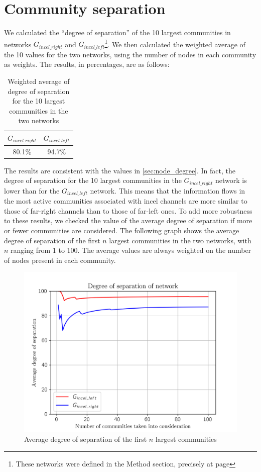 \documentclass[a4paper,twoside,12pt, openany]{book}
\begin{document}
\section{Community separation}
\label{ch:com_results}
We calculated the \enquote{degree of separation} of the 10 largest communities in networks $G_{incel\_right}$ and $G_{incel\_left}$\footnote{These networks were defined in the Method section, precisely at page \pageref{eq:couple_networks}}. We then calculated the weighted average of the 10 values for the two networks, using the number of nodes in each community as weights. The results, in percentages, are as follows:
\\

\begin{table}[h!]
	\centering
	\begin{tabular}{| c | c |}
		\hline 
		$G_{incel\_right}$ & $G_{incel\_left}$ \\ 
		\hline 
		80.1\% & 94.7\% \\ 
		\hline
	\end{tabular}
	\caption{Weighted average of degree of separation for the 10 largest communities in the two networks}
\end{table}

The results are consistent with the values in \ref{sec:node_degree}. In fact, the degree of separation for the 10 largest communities in the $G_{incel\_right}$ network is lower than for the $G_{incel\_left}$ network. This means that the information flows in the most active communities associated with incel channels are more similar to those of far-right channels than to those of far-left ones. To add more robustness to these results, we checked the value of the average degree of separation if more or fewer communities are considered. The following graph shows the average degree of separation of the first $n$ largest communities in the two networks, with $n$ ranging from 1 to 100. The average values are always weighted on the number of nodes present in each community.

\begin{figure}[h!]
	\centering
	\includegraphics[scale=0.75]{average_degree.png}
	\caption{Average degree of separation of the first $n$ largest communities}
\end{figure}
\pagebreak
\end{document}
